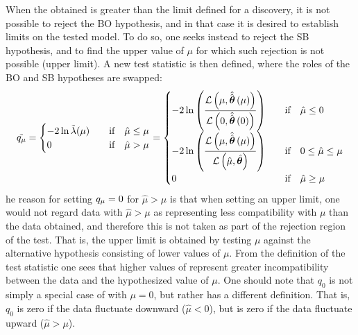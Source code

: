 When the \pval obtained is greater than the limit defined for a discovery, it is not possible to reject the \ac{BO} hypothesis, and in that case it is desired to establish limits on the tested model. To do so, one seeks instead to reject the \ac{SB} hypothesis, and to find the upper value of \(\mu\) for which such rejection is not possible (upper limit). A new test statistic is then defined, where the roles of the \ac{BO} and \ac{SB} hypotheses are swapped:
\begin{equation}
    \tilde{\qmu} =
    \begin{cases}
        -2 \ln \tilde{\lambda}(\mu) & \qif \hat{\mu} \leq \mu\\
        0                           & \qif \hat{\mu} > \mu
    \end{cases}
    =
    \begin{cases}
        \displaystyle -2 \ln \left(\frac{
            \mathcal{L} \left(\mu, \hat{\hat{\bm{\theta}}} \left(\mu\right)\right)
        }{
            \mathcal{L} \left(0, \hat{\hat{\bm{\theta}}} \left(0\right)\right)
        }\right) & \qif \hat{\mu} \leq 0\\
        \displaystyle -2 \ln \left(\frac{
            \mathcal{L} \left(\mu, \hat{\hat{\bm{\theta}}} \left(\mu\right)\right)
        }{
            \mathcal{L} \left(\hat{\mu}, \hat{\bm{\theta}}\right)
        }\right) & \qif 0 \leq \hat{\mu} \leq \mu\\
        0 & \qif \hat{\mu} \geq \mu\\
    \end{cases}
\end{equation}
he reason for setting \(q_{\mu} = 0\) for \(\hat{\mu} > \mu\) is that when setting an upper limit, one would not regard data with \(\hat{\mu} > \mu\) as representing less compatibility with \(\mu\) than the data obtained, and therefore this is not taken as part of the rejection region of the test. That is, the upper limit is obtained by testing \(\mu\) against the alternative hypothesis consisting of lower values of \(\mu\). From the definition of the test statistic one sees that higher values of \qmu represent greater incompatibility between the data and the hypothesized value of \(\mu\). One should note that \(q_0\) is not simply a special case of \qmu with \(\mu = 0\), but rather has a different definition. That is, \(q_0\) is zero if the data fluctuate downward (\(\hat{\mu} < 0\)), but \qmu is zero if the data fluctuate upward (\(\hat{\mu} > \mu\)).

